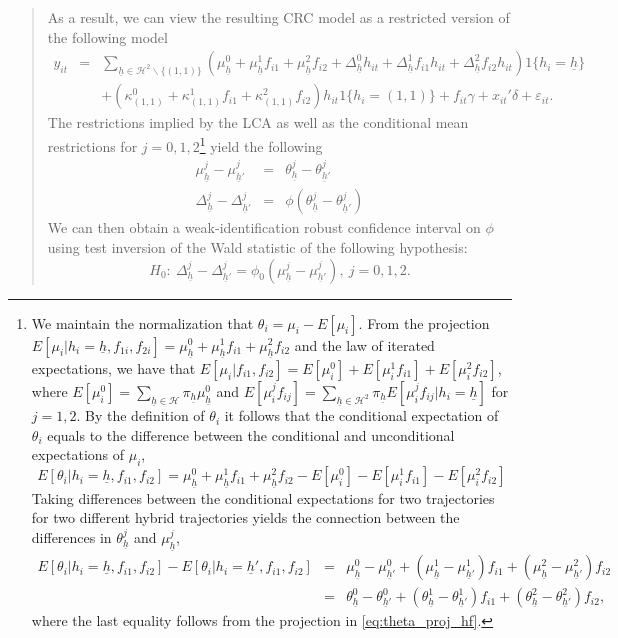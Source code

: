 \documentclass{article}[11pt]
\begin{document}
\begin{enumerate}
\begin{itemize}
\begin{quote}
As a result, we can view the resulting CRC model as a restricted version of the following model \begin{eqnarray}\label{eq:endo_grrc} y_{it}&=&\sum_{\underline{h}\in\mathcal{H}^2\backslash\{(1,1)\}}
(\mu_{\underline{h}}^0+\mu_{\underline{h}}^{1}f_{i1}+\mu_{\underline{h}}^{2}f_{i2}+\Delta_{\underline{h}}^0h_{it}+\Delta_{\underline{h}}^{1}f_{i1}h_{it}+\Delta_{\underline{h}}^{2}f_{i2}h_{it})1\{h_i=\underline{h}\}\nonumber\\
&&+(\kappa_{(1,1)}^0+\kappa_{(1,1)}^{1}f_{i1}+\kappa_{(1,1)}^{2}f_{i2})h_{it}1\{h_i=(1,1)\}+f_{it}\gamma+x_{it}'\delta+\varepsilon_{it}.
\end{eqnarray}
The restrictions implied by the LCA as well as the conditional mean restrictions for $j=0,1,2$\footnote{We maintain the normalization that $\theta_i=\mu_i-E[\mu_i]$. From the projection $E[\mu_i|h_i=\underline{h},f_{1i},f_{2i}]=\mu_{\underline{h}}^0+\mu_{\underline{h}}^1f_{i1}+\mu_{\underline{h}}^2f_{i2}$ and the law of iterated expectations, we have that $E[\mu_i|f_{i1},f_{i2}]=E[\mu_i^0]+E[\mu_i^1f_{i1}]+E[\mu_i^2f_{i2}]$, where $E[\mu_i^0]=\sum_{\underline{h}\in\mathcal{H}}\pi_{\underline{h}}\mu_{\underline{h}}^0$ and $E[\mu_i^jf_{ij}]=\sum_{\underline{h}\in\mathcal{H}^2}\pi_{\underline{h}}E[\mu_i^jf_{ij}|h_i=\underline{h}]$ for $j=1,2$. By the definition of $\theta_i$ it follows that the conditional expectation of $\theta_i$ equals to the difference between the conditional and unconditional expectations of $\mu_i$,
$$E[\theta_i|h_i=\underline{h},f_{i1},f_{i2}]=\mu_{\underline{h}}^0+\mu_{\underline{h}}^1f_{i1}+\mu_{\underline{h}}^2f_{i2}-E[\mu_i^0]-E[\mu_i^1f_{i1}]-E[\mu_i^2f_{i2}]$$
Taking differences between the conditional expectations for two trajectories for two different hybrid trajectories yields the connection between the differences in $\theta_{\underline{h}}^j$ and $\mu_{\underline{h}}^j$,
\begin{eqnarray}E[\theta_i|h_i=\underline{h},f_{i1},f_{i2}]-
E[\theta_i|h_i=\underline{h}',f_{i1},f_{i2}]&=&\mu_{\underline{h}}^0-\mu_{\underline{h}'}^0+(\mu_{\underline{h}}^1-\mu_{\underline{h}'}^1)f_{i1}+(\mu_{\underline{h}}^2-\mu_{\underline{h}'}^2)f_{i2}\\
&=&\theta_{\underline{h}}^0-\theta_{\underline{h}'}^0+(\theta_{\underline{h}}^1-\theta_{\underline{h}'}^1)f_{i1}+(\theta_{\underline{h}}^2-\theta_{\underline{h}'}^2)f_{i2},\end{eqnarray}
where the last equality follows from the projection in \eqref{eq:theta_proj_hf}.
} yield the following
\begin{eqnarray}\mu_{\underline{h}}^j-\mu_{\underline{h}'}^j~&=&\theta_{\underline{h}}^j-\theta_{\underline{h}'}^j\\
\Delta_{\underline{h}}^j-\Delta_{\underline{h}'}^j&=&\phi(\theta_{\underline{h}}^j-\theta_{\underline{h}'}^j)
\end{eqnarray}
We can then obtain a weak-identification robust confidence interval on $\phi$ using test inversion of the Wald statistic of the following hypothesis:
$$H_0:~
\Delta_{\underline{h}}^j-\Delta_{\underline{h}'}^j=\phi_0(\mu_{\underline{h}}^j-\mu_{\underline{h}'}^j),~ j=0,1,2.$$



\end{quote}
\end{itemize}
\end{enumerate}
\end{document}
